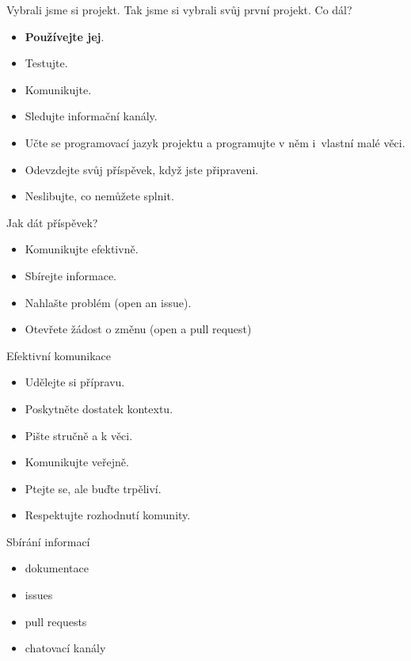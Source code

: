\documentclass[11pt]{beamer}
\begin{document}
\begin{frame}{Vybrali jsme si projekt.}
	Tak jsme si vybrali svůj první projekt. Co dál?
	\begin{itemize}
		\item \textbf{Používejte jej}.
		\item Testujte.
		\item Komunikujte.
		\item Sledujte informační kanály.
		\item Učte se programovací jazyk projektu a programujte v něm i~vlastní malé věci.
		\item Odevzdejte svůj příspěvek, když jste připraveni.
		\item Neslibujte, co nemůžete splnit.
	\end{itemize}
\end{frame}

\begin{frame}{Jak dát příspěvek?}
	\begin{itemize}
		\item Komunikujte efektivně.
		\item Sbírejte informace.
		\item Nahlašte problém (open an issue).
		\item Otevřete žádost o změnu (open a pull request)
	\end{itemize}
\end{frame}


\begin{frame}{Efektivní komunikace}
	\begin{itemize}
		\item Udělejte si přípravu.
		\item Poskytněte dostatek kontextu.
		\item Pište stručně a k věci.
		\item Komunikujte veřejně.
		\item Ptejte se, ale buďte trpěliví.
		\item Respektujte rozhodnutí komunity.
	\end{itemize}
\end{frame}

\begin{frame}{Sbírání informací}
	\begin{itemize}
		\item dokumentace
		\item issues
		\item pull requests
		\item chatovací kanály
	\end{itemize}
\end{frame}
\end{document}
